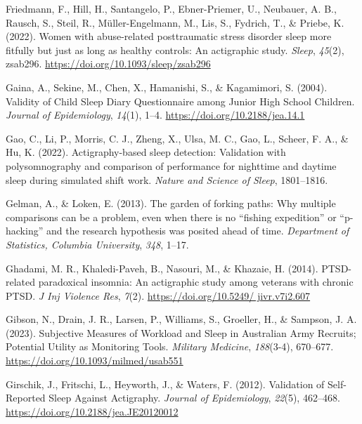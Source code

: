 \documentclass[
]{article}
\newlength{\cslhangindent}
\newenvironment{CSLReferences}[2] %
 {\begin{list}{}{%
  \setlength{\itemindent}{0pt}
  \setlength{\leftmargin}{0pt}
  \setlength{\parsep}{0pt}
  \ifodd #1
   \setlength{\leftmargin}{\cslhangindent}
   \setlength{\itemindent}{-1\cslhangindent}
  \fi
  \setlength{\itemsep}{#2\baselineskip}}}
 {\end{list}}
\begin{document}
\begin{CSLReferences}{1}{0}
Friedmann, F., Hill, H., Santangelo, P., Ebner-Priemer, U., Neubauer, A. B., Rausch, S., Steil, R., Müller-Engelmann, M., Lis, S., Fydrich, T., \& Priebe, K. (2022). Women with abuse-related posttraumatic stress disorder sleep more fitfully but just as long as healthy controls: An actigraphic study. \emph{Sleep}, \emph{45}(2), zsab296. \url{https://doi.org/10.1093/sleep/zsab296}

Gaina, A., Sekine, M., Chen, X., Hamanishi, S., \& Kagamimori, S. (2004). Validity of {Child} {Sleep} {Diary} {Questionnaire} among {Junior} {High} {School} {Children}. \emph{Journal of Epidemiology}, \emph{14}(1), 1--4. \url{https://doi.org/10.2188/jea.14.1}

Gao, C., Li, P., Morris, C. J., Zheng, X., Ulsa, M. C., Gao, L., Scheer, F. A., \& Hu, K. (2022). Actigraphy-based sleep detection: Validation with polysomnography and comparison of performance for nighttime and daytime sleep during simulated shift work. \emph{Nature and Science of Sleep}, 1801--1816.

Gelman, A., \& Loken, E. (2013). The garden of forking paths: Why multiple comparisons can be a problem, even when there is no {``fishing expedition''} or {``p-hacking''} and the research hypothesis was posited ahead of time. \emph{Department of Statistics, Columbia University}, \emph{348}, 1--17.

Ghadami, M. R., Khaledi-Paveh, B., Nasouri, M., \& Khazaie, H. (2014). {PTSD}-related paradoxical insomnia: An actigraphic study among veterans with chronic {PTSD}. \emph{J Inj Violence Res}, \emph{7}(2). \href{https://doi.org/10.5249/\%20jivr.v7i2.607}{https://doi.org/10.5249/ jivr.v7i2.607}

Gibson, N., Drain, J. R., Larsen, P., Williams, S., Groeller, H., \& Sampson, J. A. (2023). Subjective {Measures} of {Workload} and {Sleep} in {Australian} {Army} {Recruits}; {Potential} {Utility} as {Monitoring} {Tools}. \emph{Military Medicine}, \emph{188}(3-4), 670--677. \url{https://doi.org/10.1093/milmed/usab551}

Girschik, J., Fritschi, L., Heyworth, J., \& Waters, F. (2012). Validation of {Self}-{Reported} {Sleep} {Against} {Actigraphy}. \emph{Journal of Epidemiology}, \emph{22}(5), 462--468. \url{https://doi.org/10.2188/jea.JE20120012}


\end{CSLReferences}
\end{document}
